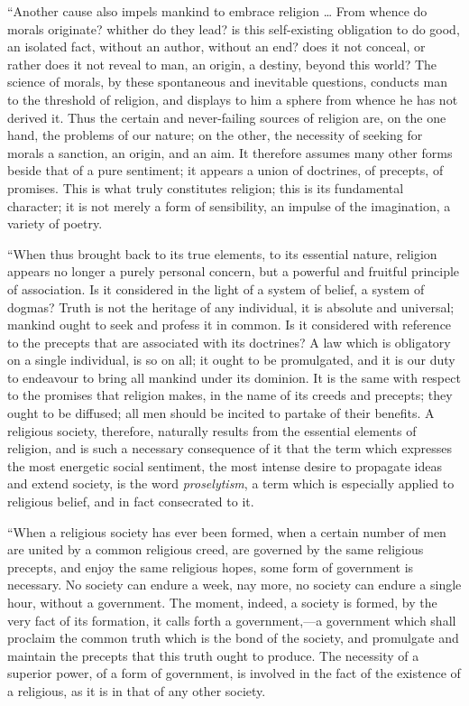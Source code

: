``Another cause also impels mankind to embrace
religion … From whence do morals originate? whither
do they lead? is this self-existing obligation to do
good, an isolated fact, without an author, without an
end? does it not conceal, or rather does it not reveal to
man, an origin, a destiny, beyond this world? The science
of morals, by these spontaneous and inevitable questions,
conducts man to the threshold of religion, and displays
to him a sphere from whence he has not derived it. Thus
the certain and never-failing sources of religion are, on
the one hand, the problems of our nature; on the other,
the necessity of seeking for morals a sanction, an
origin, and an aim. It therefore assumes many other forms
beside that of a pure sentiment; it appears a union of
doctrines, of precepts, of promises. This is what truly
constitutes religion; this is its fundamental character;
it is not merely a form of sensibility, an impulse of the
imagination, a variety of poetry.

``When thus brought back to its true elements, to
its essential nature, religion appears no longer a purely
personal concern, but a powerful and fruitful principle
of association. Is it considered in the light of a system
of belief, a system of dogmas? Truth is not the heritage
of any individual, it is absolute and universal; mankind
ought to seek and profess it in common. Is it considered
with reference to the precepts that are associated with
its doctrines? A law which is obligatory on a single
individual, is so on all; it ought to be promulgated, and
it is our duty to endeavour to bring all mankind under
its dominion. It is the same with respect to the promises
that religion makes, in the name of its creeds and
precepts; they ought to be diffused; all men should be
incited to partake of their benefits. A religious
society, therefore, naturally results from the essential
elements of religion, and is such a necessary consequence
of it that the term which expresses the most energetic
social sentiment, the most intense desire to propagate
ideas and extend society, is the word \emph{proselytism},
a term which is especially applied to religious belief,
and in fact consecrated to it.

``When a religious society has ever been formed,
when a certain number of men are united by a common
religious creed, are governed by the same religious
precepts, and enjoy the same religious hopes, some form
of government is necessary. No society can endure a week,
nay more, no society can endure a single hour, without a
government. The moment, indeed, a society is formed, by
the very fact of its formation, it calls forth a
government,—a government which shall proclaim the
common truth which is the bond of the society, and
promulgate and maintain the precepts that this truth
ought to produce. The necessity of a superior power, of a
form of government, is involved in the fact of the
existence of a religious, as it is in that of any other
society.

